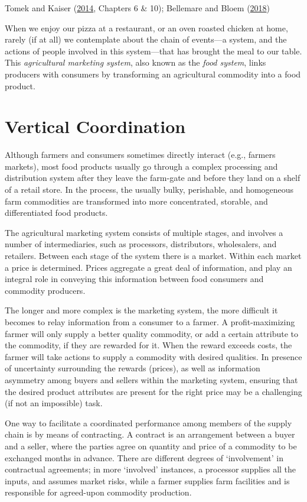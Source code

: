 \documentclass[
]{book}
\begin{document}
Tomek and Kaiser (\protect\hyperlink{ref-tomek2014}{2014}, Chapters 6 \& 10); Bellemare and Bloem (\protect\hyperlink{ref-bellemare2018}{2018})

When we enjoy our pizza at a restaurant, or an oven roasted chicken at home, rarely (if at all) we contemplate about the chain of events---a system, and the actions of people involved in this system---that has brought the meal to our table. This \emph{agricultural marketing system}, also known as the \emph{food system}, links producers with consumers by transforming an agricultural commodity into a food product.

\hypertarget{vertical-coordination}{%
\section{Vertical Coordination}\label{vertical-coordination}}

Although farmers and consumers sometimes directly interact (e.g., farmers markets), most food products usually go through a complex processing and distribution system after they leave the farm-gate and before they land on a shelf of a retail store. In the process, the usually bulky, perishable, and homogeneous farm commodities are transformed into more concentrated, storable, and differentiated food products.

The agricultural marketing system consists of multiple stages, and involves a number of intermediaries, such as processors, distributors, wholesalers, and retailers. Between each stage of the system there is a market. Within each market a price is determined. Prices aggregate a great deal of information, and play an integral role in conveying this information between food consumers and commodity producers.

The longer and more complex is the marketing system, the more difficult it becomes to relay information from a consumer to a farmer. A profit-maximizing farmer will only supply a better quality commodity, or add a certain attribute to the commodity, if they are rewarded for it. When the reward exceeds costs, the farmer will take actions to supply a commodity with desired qualities. In presence of uncertainty surrounding the rewards (prices), as well as information asymmetry among buyers and sellers within the marketing system, ensuring that the desired product attributes are present for the right price may be a challenging (if not an impossible) task.

One way to facilitate a coordinated performance among members of the supply chain is by means of contracting. A contract is an arrangement between a buyer and a seller, where the parties agree on quantity and price of a commodity to be exchanged months in advance. There are different degrees of `involvement' in contractual agreements; in more `involved' instances, a processor supplies all the inputs, and assumes market risks, while a farmer supplies farm facilities and is responsible for agreed-upon commodity production.
\end{document}
